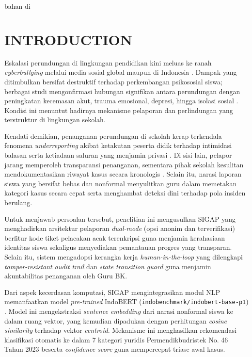 bahan di\documentclass[conference]{IEEEtran}
\begin{document}
\section{INTRODUCTION}

Eskalasi perundungan di lingkungan pendidikan kini meluas ke ranah \textit{cyberbullying} melalui media sosial global \cite{zhang2022} maupun di Indonesia \cite{kaloeti2021}. Dampak yang ditimbulkan bersifat destruktif terhadap perkembangan psikososial siswa; berbagai studi mengonfirmasi hubungan signifikan antara perundungan dengan peningkatan kecemasan akut, trauma emosional, depresi, hingga isolasi sosial \cite{fabris2024}. Kondisi ini menuntut hadirnya mekanisme pelaporan dan perlindungan yang terstruktur di lingkungan sekolah.

Kendati demikian, penanganan perundungan di sekolah kerap terkendala fenomena \textit{underreporting} akibat ketakutan peserta didik terhadap intimidasi balasan serta ketiadaan saluran yang menjamin privasi \cite{wachs2022,lee2024}. Di sisi lain, pelapor jarang memperoleh transparansi penanganan, sementara pihak sekolah kesulitan mendokumentasikan riwayat kasus secara kronologis \cite{evangelio2022,kasturiratna2025}. Selain itu, narasi laporan siswa yang bersifat bebas dan nonformal menyulitkan guru dalam memetakan kategori kasus secara cepat serta menghambat deteksi dini terhadap pola insiden berulang.

Untuk menjawab persoalan tersebut, penelitian ini mengusulkan SIGAP yang menghadirkan arsitektur pelaporan \textit{dual-mode} (opsi anonim dan terverifikasi) berfitur kode tiket pelacakan acak terenkripsi guna menjamin kerahasiaan identitas siswa sekaligus menyediakan pemantauan progres yang transparan. Selain itu, sistem mengadopsi kerangka kerja \textit{human-in-the-loop} yang dilengkapi \textit{tamper-resistant audit trail} dan \textit{state transition guard} guna menjamin akuntabilitas penanganan oleh Guru BK.

Dari aspek kecerdasan komputasi, SIGAP mengintegrasikan modul NLP memanfaatkan model \textit{pre-trained} IndoBERT (\texttt{indobenchmark/indobert-base-p1}) \cite{wilie2020}. Model ini mengekstraksi \textit{sentence embedding} dari narasi nonformal siswa ke dalam ruang vektor, yang kemudian dipadukan dengan perhitungan \textit{cosine similarity} terhadap vektor \textit{centroid}. Mekanisme ini menghasilkan rekomendasi klasifikasi otomatis ke dalam 7 kategori yuridis Permendikbudristek No. 46 Tahun 2023 beserta \textit{confidence score} guna mempercepat triase awal kasus.
\end{document}
